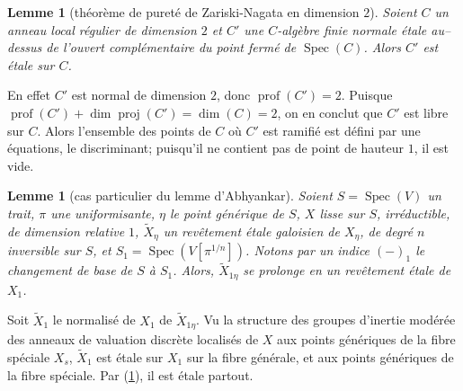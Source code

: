 \documentclass{book}
\DeclareMathOperator{\spec}{Spec}
\newtheorem{lemma}[subsubsection]{Lemme}
\begin{document}
\begin{lemma}[théorème de pureté de Zariski-Nagata en dimension $2$] \label{I:5-2-4} %
Soient $C$ un anneau local régulier de dimension $2$ et $C'$ une $C$-algèbre 
finie normale étale au--dessus de l'ouvert complémentaire du point fermé 
de $\spec(C)$. Alors $C'$ est étale sur $C$.
\end{lemma}

En effet $C'$ est normal de dimension $2$, donc $\operatorname{prof}(C')=2$. 
Puisque $\operatorname{prof}(C')+\dim\operatorname{proj}(C') = \dim(C)=2$, on 
en conclut que $C'$ est libre sur $C$. Alors l'ensemble des points de $C$ où 
$C'$ est ramifié est défini par une équations, le discriminant; puisqu'il 
ne contient pas de point de hauteur $1$, il est vide. 





\begin{lemma}[cas particulier du lemme d'Abhyankar]\label{I:5-2-5} %
Soient $S=\spec(V)$ un trait, $\pi$ une uniformisante, $\eta$ le point 
générique de $S$, $X$ lisse sur $S$, irréductible, de dimension 
relative $1$, $\widetilde X_\eta$ un revêtement étale galoisien de $X_\eta$, 
de degré $n$ inversible sur $S$, et $S_1=\spec\left(V[\pi^{1/n}]\right)$. 
Notons par un indice $(-)_1$ le changement de base de $S$ à $S_1$. Alors, 
$\widetilde X_{1\eta}$ se prolonge en un revêtement étale de $X_1$. 
\end{lemma}

Soit $\widetilde X_1$ le normalisé de $X_1$ de $\widetilde X_{1\eta}$. Vu la 
structure des groupes d'inertie modérée des anneaux de valuation discrète 
localisés de $X$ aux points génériques de la fibre spéciale $X_s$, 
$\widetilde X_1$ est étale sur $X_1$ sur la fibre générale, et aux points 
génériques de la fibre spéciale. Par (\ref{I:5-2-4}), il est étale 
partout. 





\subsubsection{}\label{I:5-2-6} %
\end{document}

